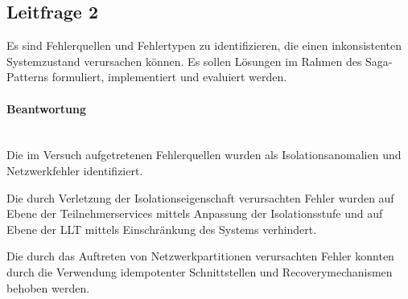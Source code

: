 \subsection{Leitfrage 2}
Es sind Fehlerquellen und Fehlertypen zu identifizieren, die einen inkonsistenten Systemzustand verursachen können. Es sollen Lösungen im Rahmen des Saga-Patterns formuliert, implementiert und evaluiert werden. 

\paragraph*{Beantwortung} \mbox{} \\
Die im Versuch aufgetretenen Fehlerquellen wurden als Isolationsanomalien und Netzwerkfehler identifiziert. 

Die durch Verletzung der Isolationseigenschaft verursachten Fehler wurden auf Ebene der Teilnehmerservices mittels Anpassung der Isolationsstufe und auf Ebene der LLT mittels Einschränkung des Systems verhindert. 

Die durch das Auftreten von Netzwerkpartitionen verursachten Fehler konnten durch die Verwendung idempotenter Schnittstellen und Recoverymechanismen behoben werden.